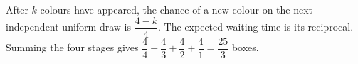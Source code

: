 After $k$ colours have appeared, the chance of a new colour on the next independent uniform draw is $\dfrac{4-k}{4}$. The expected waiting time is its reciprocal. Summing the four stages gives $\dfrac{4}{4}+\dfrac{4}{3}+\dfrac{4}{2}+\dfrac{4}{1}=\boxed{\dfrac{25}{3}}$ boxes.
